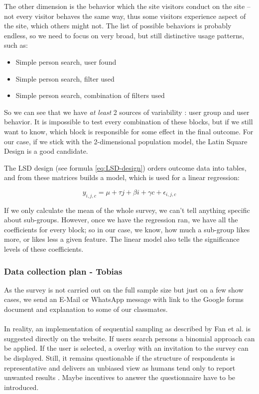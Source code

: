 \documentclass[12pt,a4paper,paper=a4,oneside,titlepage,pdftex]{scrartcl}
\begin{document}
The other dimension is the behavior which the site visitors conduct on the site -- not every visitor behaves the same way, thus some visitors experience aspect of the site, which others might not. The list of possible behaviors is probably endless, so we need to focus on very broad, but still distinctive usage patterns, such as:
\begin{itemize}
	\item Simple person search, user found
	\item Simple person search, filter used
	\item Simple person search, combination of filters used
\end{itemize}

So we can see that we have \textit{at least }2 sources of variability : user group and user behavior. It is impossible to test every combination of these blocks, but if we still want to know, which block is responsible for some effect in the final outcome. For our case, if we stick with the 2-dimensional population model, the Latin Square Design is a good candidate.

The LSD design (see formula \ref{eq:LSD-design}) orders outcome data into tables, and from these matrices builds a model, which is used for a linear regression:

\begin{equation}
y_{i,j,c} = \mu + \tau j + \beta i + \gamma c + \epsilon_{i,j,c}
\label{eq:LSD-design}
\end{equation}

If we only calculate the mean of the whole survey, we can't tell anything specific about sub-groups. However, once we have the regression ran, we have all the coefficients for every block; so in our case, we know, how much a sub-group likes more, or likes less a given feature. The linear model also tells the significance levels of these coefficients.


\subsubsection{Data collection plan - Tobias}
As the survey is not carried out on the full sample size but just on a few show cases, we send an E-Mail or WhatsApp message with link to the Google forms document and explanation to some of our classmates.
\\ \\
In reality, an implementation of sequential sampling as described by Fan et al. \cite{fan1962development} is suggested directly on the website. If users search persons a binomial approach can be applied. If the user is selected, a overlay with an invitation to the survey can be displayed. Still, it remains questionable if the structure of respondents is representative and delivers an unbiased view as humans tend only to report unwanted results \cite{bergstrand1983bias}. Maybe incentives to answer the questionnaire have to be introduced.
\end{document}
